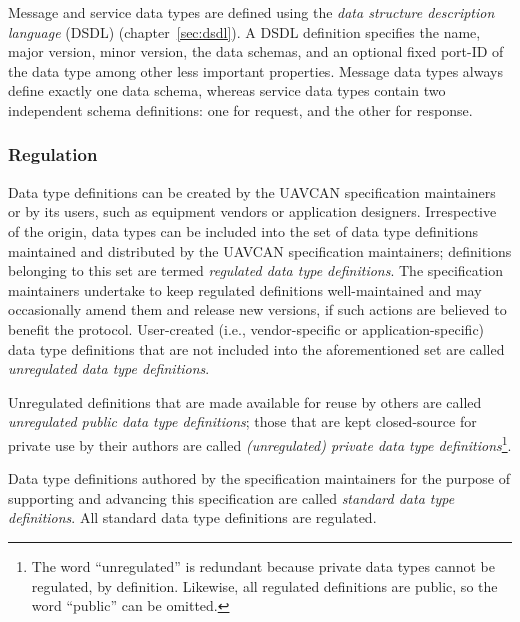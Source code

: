 Message and service data types
are defined using the \emph{data structure description language} (DSDL) (chapter~\ref{sec:dsdl}).
A DSDL definition specifies the name, major version, minor version, the data schemas,
and an optional fixed port-ID of the data type among other less important properties.
Message data types always define exactly one data schema, whereas
service data types contain two independent schema definitions: one for request, and the other for response.

\subsubsection{Regulation}\label{sec:basic_data_type_regulation}

Data type definitions can be created by the UAVCAN specification maintainers or by its users,
such as equipment vendors or application designers.
Irrespective of the origin, data types can be included into the set of data type definitions maintained
and distributed by the UAVCAN specification maintainers;
definitions belonging to this set are termed \emph{regulated data type definitions}.
The specification maintainers undertake to keep regulated definitions well-maintained and may occasionally
amend them and release new versions, if such actions are believed to benefit the protocol.
User-created (i.e., vendor-specific or application-specific) data type definitions that are
not included into the aforementioned set are called \emph{unregulated data type definitions}.

Unregulated definitions that are made available for reuse by others are called
\emph{unregulated public data type definitions};
those that are kept closed-source for private use by their authors are called
\emph{(unregulated) private data type definitions}\footnote{%
    The word ``unregulated'' is redundant because private data types cannot be regulated, by definition.
    Likewise, all regulated definitions are public, so the word ``public'' can be omitted.
}.

Data type definitions authored by the specification maintainers for the purpose of supporting and advancing
this specification are called \emph{standard data type definitions}.
All standard data type definitions are regulated.

